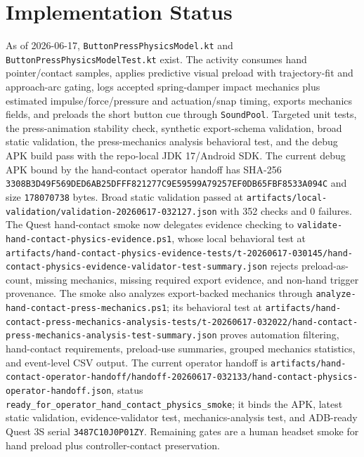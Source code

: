 \documentclass[11pt]{article}
\begin{document}
\section{Implementation Status}
As of 2026-06-17, \texttt{ButtonPressPhysicsModel.kt} and \texttt{ButtonPressPhysicsModelTest.kt} exist. The activity consumes hand pointer/contact samples, applies predictive visual preload with trajectory-fit and approach-arc gating, logs accepted spring-damper impact mechanics plus estimated impulse/force/pressure and actuation/snap timing, exports mechanics fields, and preloads the short button cue through \texttt{SoundPool}. Targeted unit tests, the press-animation stability check, synthetic export-schema validation, broad static validation, the press-mechanics analysis behavioral test, and the debug APK build pass with the repo-local JDK 17/Android SDK. The current debug APK bound by the hand-contact operator handoff has SHA-256 \texttt{3308B3D49F569DED6AB25DFFF821277C9E59599A79257EF0DB65FBF8533A094C} and size \texttt{178070738} bytes. Broad static validation passed at \texttt{artifacts/local-validation/validation-20260617-032127.json} with 352 checks and 0 failures. The Quest hand-contact smoke now delegates evidence checking to \texttt{validate-hand-contact-physics-evidence.ps1}, whose local behavioral test at \texttt{artifacts/hand-contact-physics-evidence-tests/t-20260617-030145/hand-contact-physics-evidence-validator-test-summary.json} rejects preload-as-count, missing mechanics, missing required export evidence, and non-hand trigger provenance. The smoke also analyzes export-backed mechanics through \texttt{analyze-hand-contact-press-mechanics.ps1}; its behavioral test at \texttt{artifacts/hand-contact-press-mechanics-analysis-tests/t-20260617-032022/hand-contact-press-mechanics-analysis-test-summary.json} proves automation filtering, hand-contact requirements, preload-use summaries, grouped mechanics statistics, and event-level CSV output. The current operator handoff is \texttt{artifacts/hand-contact-operator-handoff/handoff-20260617-032133/hand-contact-physics-operator-handoff.json}, status \texttt{ready\_for\_operator\_hand\_contact\_physics\_smoke}; it binds the APK, latest static validation, evidence-validator test, mechanics-analysis test, and ADB-ready Quest 3S serial \texttt{3487C10J0P01ZY}. Remaining gates are a human headset smoke for hand preload plus controller-contact preservation.
\end{document}
